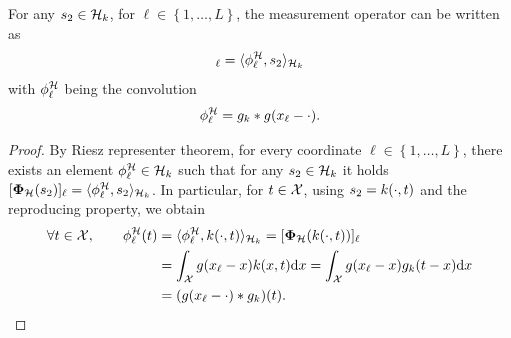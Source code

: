 \documentclass[12pt]{article}
\begin{document}
            {\color{red}
            \begin{proposition}
                \label{prop:phihh}
                For any $s_2 \in \mathcal{H}_k$, for $\ell \in \left\{ 1, \dots, L \right\}$, the measurement operator can be written as
                \begin{equation}
                    [\phih(\fh)]_\ell = \langle \phihh_\ell, \fh \rangle_{\cHk}
                \end{equation}
                with $\phi^\mathcal{H}_\ell$ being the convolution
                \begin{equation}
                    \phi^\mathcal{H}_\ell = g_k * g(x_\ell - \cdot).
                \end{equation}
            \end{proposition}
            \begin{proof}
                

                By Riesz representer theorem, for every coordinate  $\ell \in \left\{1, \dots, L \right\}$, there exists an element $\phi^\mathcal{H}_\ell \in \mathcal{H}_k$ such that for any $s_2 \in \mathcal{H}_k$ it holds $[\bm{\Phi}_\mathcal{H}(s_2)]_\ell = \langle \phi^\mathcal{H}_\ell , s_2 \rangle_{\mathcal{H}_k}$. In particular, for $t \in \mathcal{X}$, using $s_2 = k(\cdot, t)$ and the reproducing property, we obtain
                \begin{align*}
                    \forall t \in \mathcal{X}, \qquad \phi^\mathcal{H}_\ell(t)
                    &= \langle \phi^\mathcal{H}_\ell, k(\cdot, t) \rangle_{\mathcal{H}_k} = [\bm{\Phi}_\mathcal{H}(k(\cdot, t))]_\ell \\
                    & = \int_{\mathcal{X}} g(x_\ell - x) k(x, t) \mathrm{d}x = \int_{\mathcal{X}} g(x_\ell - x) g_k(t - x) \mathrm{d}x \\
                    & = (g(x_\ell - \cdot) * g_k)(t).
                \end{align*}   
            \end{proof}
            }
            
\end{document}
